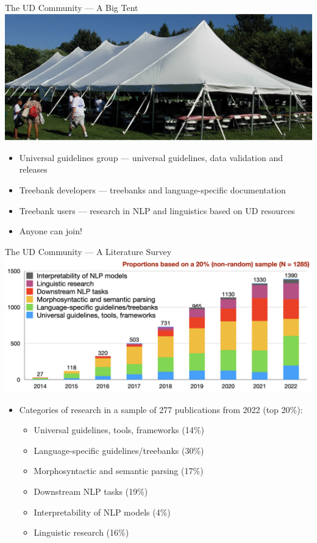 \documentclass[10pt, compress, aspectratio=169]{beamer}
\begin{document}
\begin{frame}{The UD Community --- A Big Tent}
\centering
\includegraphics[scale=0.4]{images/BigTent}

\bigskip
\begin{itemize}
\item Universal guidelines group --- universal guidelines, data validation and releases
\item Treebank developers --- treebanks and language-specific documentation 
\item Treebank users --- research in NLP and linguistics based on UD resources
\item Anyone can join!
\end{itemize}
\end{frame}

\begin{frame}{The UD Community --- A Literature Survey}
\centering
\includegraphics[scale=0.15]{images/LiteratureSurvey}

\bigskip
\begin{itemize}
\item Categories of research in a sample of 277 publications from 2022 (top 20\%):
\begin{itemize}
\item Universal guidelines, tools, frameworks (14\%)
\item Language-specific guidelines/treebanks (30\%)
\item Morphosyntactic and semantic parsing (17\%)
\item Downstream NLP tasks (19\%)
\item Interpretability of NLP models (4\%)
\item Linguistic research (16\%)
\end{itemize}
\end{itemize}
\end{frame}
\end{document}

